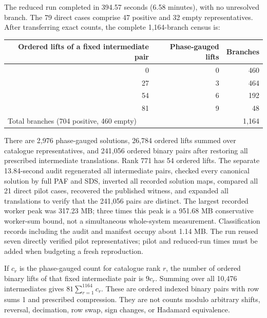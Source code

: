\documentclass[11pt]{article}
\begin{document}
The reduced run completed in 394.57 seconds (6.58 minutes), with no unresolved
branch. The 79 direct cases comprise 47 positive and 32 empty representatives.
After transferring exact counts, the complete 1,164-branch census is:
\begin{center}
\begin{tabular}{rrr}
\toprule
Ordered lifts of a fixed intermediate pair & Phase-gauged lifts & Branches\\
\midrule
0 & 0 & 460\\
27 & 3 & 464\\
54 & 6 & 192\\
81 & 9 & 48\\
\midrule
\multicolumn{2}{l}{Total branches (704 positive, 460 empty)} & 1,164\\
\bottomrule
\end{tabular}
\end{center}
There are 2,976 phase-gauged solutions, 26,784 ordered lifts summed over
catalogue representatives, and 241,056 ordered binary pairs after restoring
all prescribed intermediate translations. Rank 771 has 54 ordered lifts.
The separate 13.84-second audit regenerated all intermediate pairs, checked
every canonical solution by full PAF and SDS, inverted all recorded solution
maps, compared all 21 direct pilot cases, recovered the published witness,
and expanded all translations to verify that the 241,056 pairs are distinct.
The largest recorded worker peak was 317.23 MB; three times this peak is a
951.68 MB conservative worker-sum bound, not a simultaneous whole-system
measurement. Classification records including the audit and manifest occupy
about 1.14 MB. The run reused seven directly verified pilot representatives;
pilot and reduced-run times must be added when budgeting a fresh reproduction.

If $c_r$ is the phase-gauged count for catalogue rank $r$, the number of
ordered binary lifts of that fixed intermediate pair is $9c_r$. Summing
over all 10,476 intermediates gives $81\sum_{r=1}^{1164}c_r$. These are
ordered indexed binary pairs with row sums 1 and prescribed compression.
They are not counts modulo arbitrary shifts, reversal, decimation, row swap,
sign changes, or Hadamard equivalence.
\end{document}
